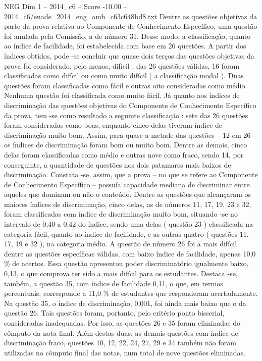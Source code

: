 \begin{textsample}{NEG Dim 1 – 2014\_c6 – Score -10.00 – 2014\_c6/enade\_2014\_eng\_amb\_c63c648bd8.txt}
Dentre as questões objetivas da parte da prova relativa ao Componente de Conhecimento Específico, uma questão foi anulada pela Comissão, a de número 31.
Desse modo, a classificação, quanto ao índice de facilidade, foi estabelecida com base em 26 questões.
A partir dos índices obtidos, pode -se concluir que quase dois terços das questões objetivas da prova foi considerado, pelo menos, difícil : das 26 questões válidas, 16 foram classificadas como difícil ou como muito difícil ( a classificação modal ).
Duas questões foram classificadas como fácil e outras oito consideradas como médio.
Nenhuma questão foi classificada como muito fácil.
Já quanto aos índices de discriminação das questões objetivas do Componente de Conhecimento Específico da prova, tem -se como resultado a seguinte classificação : sete das 26 questões foram consideradas como boas, enquanto cinco delas tiveram índice de discriminação muito bom.
Assim, para quase a metade das questões – 12 em 26 – os índices de discriminação foram bom ou muito bom.
Dentre as demais, cinco delas foram classificadas como médio e outras nove como fraco, sendo 14, por conseguinte, a quantidade de questões nos dois patamares mais baixos de discriminação.
Constata -se, assim, que a prova – no que se refere ao Componente de Conhecimento Específico – possuía capacidade mediana de discriminar entre aqueles que dominam ou não o conteúdo.
Dentre as questões que alcançaram os maiores índices de discriminação, cinco delas, as de números 11, 17, 19, 23 e 32, foram classificadas com índice de discriminação muito bom, situando -se no intervalo de 0,40 a 0,42 do índice, sendo uma delas ( questão 23 ) classificada na categoria fácil, quanto ao índice de facilidade, e as outras quatro ( questões 11, 17, 19 e 32 ), na categoria médio.
A questão de número 26 foi a mais difícil dentre as questões específicas válidas, com baixo índice de facilidade, apenas 10,0 \% de acertos.
Essa questão apresentou poder discriminatório igualmente baixo, 0,13, o que comprova ter sido a mais difícil para os estudantes.
Destaca -se, também, a questão 35, com índice de facilidade 0,11, o que, em termos percentuais, corresponde a 11,0 \% de estudantes que responderam acertadamente.
Na questão 35, o índice de discriminação, 0,001, foi ainda mais baixo que o da questão 26.
Tais questões foram, portanto, pelo critério ponto bisserial, consideradas inadequadas.
Por isso, as questões 26 e 35 foram eliminadas do cômputo da nota final.
Além destas duas, as demais questões com índice de discriminação fraco, questões 10, 12, 22, 24, 27, 29 e 34 também não foram utilizadas no cômputo final das notas, num total de nove questões eliminadas.

\end{textsample}
